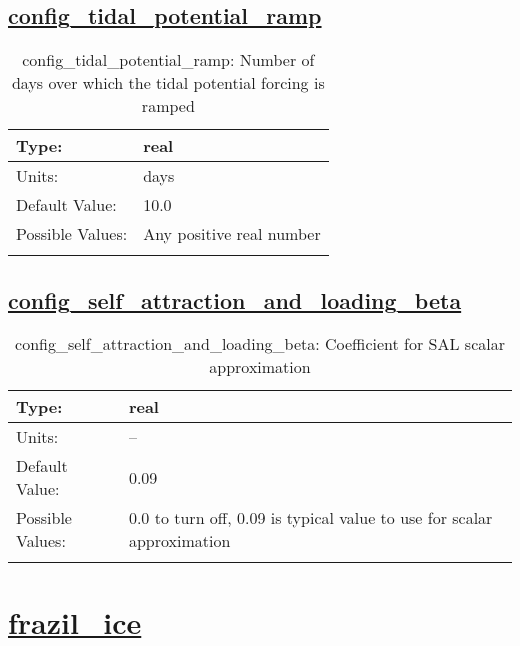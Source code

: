 \subsection[config\_tidal\_potential\_ramp]{\hyperref[sec:nm_tab_tidal_potential_forcing]{config\_tidal\_potential\_ramp}}
\label{subsec:nm_sec_config_tidal_potential_ramp}
\begin{center}
\begin{longtable}{| p{2.0in} || p{4.0in} |}
    \hline
    Type: & real \\
    \hline
    Units: & \si{days} \\
    \hline
    Default Value: & 10.0 \\
    \hline
    Possible Values: & Any positive real number \\
    \hline
    \caption{config\_tidal\_potential\_ramp: Number of days over which the tidal potential forcing is ramped}
\end{longtable}
\end{center}
\subsection[config\_self\_attraction\_and\_loading\_beta]{\hyperref[sec:nm_tab_tidal_potential_forcing]{config\_self\_attraction\_and\_loading\_beta}}
\label{subsec:nm_sec_config_self_attraction_and_loading_beta}
\begin{center}
\begin{longtable}{| p{2.0in} || p{4.0in} |}
    \hline
    Type: & real \\
    \hline
    Units: & -- \\
    \hline
    Default Value: & 0.09 \\
    \hline
    Possible Values: & 0.0 to turn off, 0.09 is typical value to use for scalar approximation \\
    \hline
    \caption{config\_self\_attraction\_and\_loading\_beta: Coefficient for SAL scalar approximation}
\end{longtable}
\end{center}
\section[frazil\_ice]{\hyperref[sec:nm_tab_frazil_ice]{frazil\_ice}}
\label{sec:nm_sec_frazil_ice}

